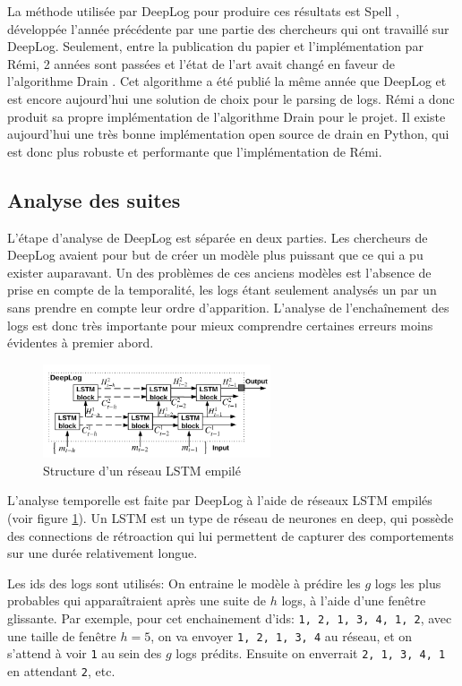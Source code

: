 \documentclass[openany, 11pt]{memoir}
\begin{document}
La méthode utilisée par DeepLog pour produire ces résultats est Spell \cite{spell}, développée l'année précédente par une partie des chercheurs qui ont travaillé sur DeepLog. Seulement, entre la publication du papier et l'implémentation par Rémi, 2 années sont passées et l'état de l'art avait changé en faveur de l'algorithme Drain \cite{drain}. Cet algorithme a été publié la même année que DeepLog et est encore aujourd'hui une solution de choix pour le parsing de \glspl{log}. Rémi a donc produit sa propre implémentation de l'algorithme Drain pour le projet. Il existe aujourd'hui une très bonne implémentation open source de drain en Python, qui est donc plus robuste et performante que l'implémentation de Rémi.

\subsection{Analyse des suites}

L'étape d'analyse de DeepLog est séparée en deux parties. Les chercheurs de DeepLog avaient pour but de créer un modèle plus puissant que ce qui a pu exister auparavant. Un des problèmes de ces anciens modèles est l'absence de prise en compte de la temporalité, les \glspl{log} étant seulement analysés un par un sans prendre en compte leur ordre d'apparition. L'analyse de l'enchaînement des logs est donc très importante pour mieux comprendre certaines erreurs moins évidentes à premier abord.

\begin{figure}[ht]
	\centering
	\includegraphics[width=0.6\textwidth]{images/stacked_lstm.png}
	\caption{Structure d'un réseau LSTM empilé}
	\label{lstm}
\end{figure}

L'analyse temporelle est faite par DeepLog à l'aide de réseaux \gls{LSTM} empilés (voir figure \ref{lstm}). Un \gls{LSTM} est un type de réseau de neurones en \gls{deep}, qui possède des connections de rétroaction qui lui permettent de capturer des comportements sur une durée relativement longue.

Les ids des \glspl{log} sont utilisés: On entraine le modèle à prédire les $g$ logs les plus probables qui apparaîtraient après une suite de $h$ logs, à l'aide d'une fenêtre glissante. Par exemple, pour cet enchainement d'ids: \texttt{1, 2, 1, 3, 4, 1, 2}, avec une taille de fenêtre $h=5$, on va envoyer \texttt{1, 2, 1, 3, 4} au réseau, et on s'attend à voir \texttt{1} au sein des $g$ logs prédits. Ensuite on enverrait \texttt{2, 1, 3, 4, 1} en attendant \texttt{2}, etc.
\end{document}
